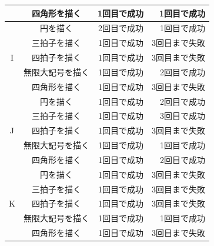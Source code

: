 \documentclass[11pt]{jreport}
\begin{document}
\begin{center}
\begin{longtable}{|c|c|r|r|}
                  & 四角形を描く & 1回目で成功 & 1回目で成功 \\ \hline %
                  & 円を描く & 2回目で成功 & 1回目で成功 \\ \cline{2-4} %
                  & 三拍子を描く & 1回目で成功 & 3回目まで失敗 \\ \cline{2-4}
                I & 四拍子を描く & 1回目で成功 & 3回目まで失敗 \\ \cline{2-4}
                  & 無限大記号を描く & 1回目で成功 & 2回目で成功 \\ \cline{2-4}
                  & 四角形を描く & 1回目で成功 & 3回目まで失敗 \\ \hline %
                  & 円を描く & 1回目で成功 & 2回目で成功 \\ \cline{2-4} %
                  & 三拍子を描く & 1回目で成功 & 3回目で成功 \\ \cline{2-4}
                J & 四拍子を描く & 1回目で成功 & 3回目まで失敗 \\ \cline{2-4}
                  & 無限大記号を描く & 1回目で成功 & 1回目で成功 \\ \cline{2-4}
                  & 四角形を描く & 1回目で成功 & 2回目で成功 \\ \hline %
                  & 円を描く & 1回目で成功 & 3回目まで失敗 \\ \cline{2-4}
                  & 三拍子を描く & 1回目で成功 & 3回目まで失敗 \\ \cline{2-4}
                K & 四拍子を描く & 1回目で成功 & 3回目まで失敗 \\ \cline{2-4}
                  & 無限大記号を描く & 1回目で成功 & 1回目で成功 \\ \cline{2-4}
                  & 四角形を描く & 1回目で成功 & 3回目まで失敗 \\ \hline
            \end{longtable}
        \end{center}
\end{document}
